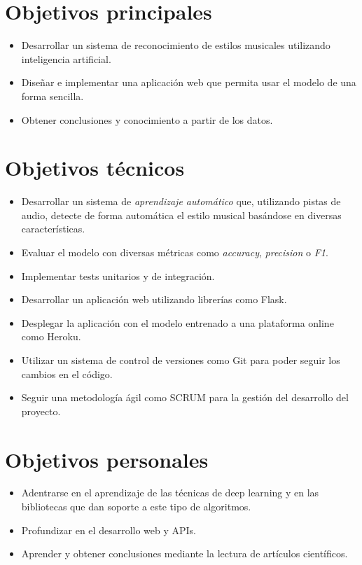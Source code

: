 \section{Objetivos principales}
\begin{itemize}
\tightlist
\item Desarrollar un sistema de reconocimiento de estilos musicales utilizando inteligencia artificial.
\item Diseñar e implementar una aplicación web que permita usar el modelo de una forma sencilla.
\item Obtener conclusiones y conocimiento a partir de los datos.
\end{itemize}

\section{Objetivos técnicos}
\begin{itemize}
\tightlist
\item Desarrollar un sistema de \textit{aprendizaje automático} que, utilizando pistas de audio, detecte de forma automática el estilo musical basándose en diversas características.
\item Evaluar el modelo con diversas métricas como \textit{accuracy}, \textit{precision} o \textit{F1}.
\item Implementar tests unitarios y de integración.
\item Desarrollar un aplicación web utilizando librerías como Flask.
\item Desplegar la aplicación con el modelo entrenado a una plataforma online como Heroku.
\item Utilizar un sistema de control de versiones como Git para poder seguir los cambios en el código.
\item Seguir una metodología ágil como SCRUM para la gestión del desarrollo del proyecto.
\end{itemize}

\section{Objetivos personales}
\begin{itemize}
\tightlist
\item Adentrarse en el aprendizaje de las técnicas de deep learning y en las bibliotecas que dan soporte a este tipo de algoritmos.
\item Profundizar en el desarrollo web y APIs.
\item Aprender y obtener conclusiones mediante la lectura de artículos científicos.
\end{itemize}